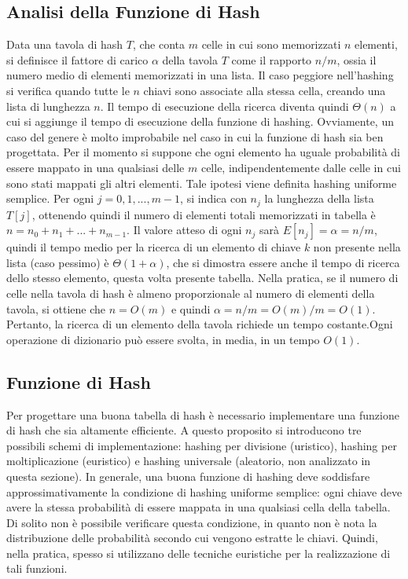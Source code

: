 \subsection{Analisi della Funzione di Hash}
Data una tavola di hash \(T\), che conta \(m\) celle in cui sono memorizzati \(n\) elementi, si definisce il fattore di carico \(\alpha\) della tavola \(T\) come il rapporto \(n/m\), ossia il numero medio di elementi memorizzati in una lista. Il caso peggiore nell'hashing si verifica quando tutte le \(n\) chiavi sono associate alla stessa cella, creando una lista di lunghezza \(n\). Il tempo di esecuzione della ricerca diventa quindi \(\Theta(n)\) a cui si aggiunge il tempo di esecuzione della funzione di hashing. Ovviamente, un caso del genere è molto improbabile nel caso in cui la funzione di hash sia ben progettata. Per il momento si suppone che ogni elemento ha uguale probabilità di essere mappato in una qualsiasi delle \(m\) celle, indipendentemente dalle celle in cui sono stati mappati gli altri elementi. Tale ipotesi viene definita hashing uniforme semplice. Per ogni \(j=0,1,..., m-1\), si indica con \(n_j\) la lunghezza della lista \(T[j]\), ottenendo quindi il numero di elementi totali memorizzati in tabella è \(n=n_0+n_1+...+n_{m-1}\). Il valore atteso di ogni \(n_j\) sarà \(E[n_j] = \alpha = n/m\), quindi il tempo medio per la ricerca di un elemento di chiave \(k\) non presente nella lista (caso pessimo) è \(\Theta(1+\alpha)\), che si dimostra essere anche il tempo di ricerca dello stesso elemento, questa volta presente tabella. Nella pratica, se il numero di celle nella tavola di hash è almeno proporzionale al numero di elementi della tavola, si ottiene che \(n=O(m)\) e quindi \(\alpha = n/m = O(m)/m = O(1)\). Pertanto, la ricerca di un elemento della tavola richiede un tempo costante.Ogni operazione di dizionario può essere svolta, in media, in un tempo \(O(1)\).

\subsection{Funzione di Hash}
Per progettare una buona tabella di hash è necessario implementare una funzione di hash che sia altamente efficiente. A questo proposito si introducono tre possibili schemi di implementazione: hashing per divisione (uristico), hashing per moltiplicazione (euristico) e hashing universale (aleatorio, non analizzato in questa sezione). In generale, una buona funzione di hashing deve soddisfare approssimativamente la condizione di hashing uniforme semplice: ogni chiave deve avere la stessa probabilità di essere mappata in una qualsiasi cella della tabella. Di solito non è possibile verificare questa condizione, in quanto non è nota la distribuzione delle probabilità secondo cui vengono estratte le chiavi. Quindi, nella pratica, spesso si utilizzano delle tecniche euristiche per la realizzazione di tali funzioni.

